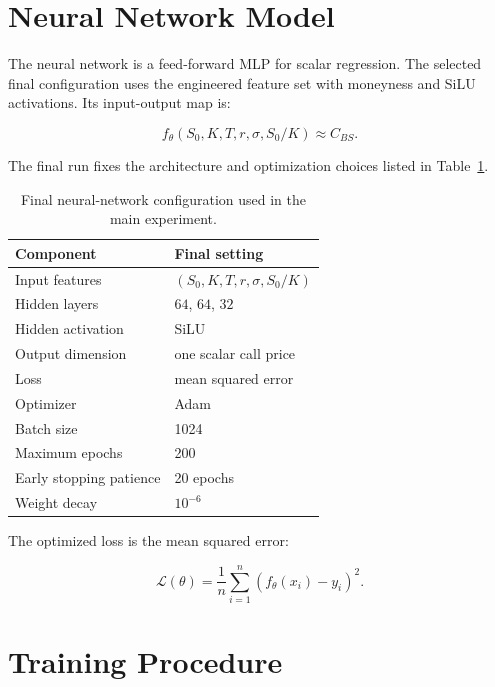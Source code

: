 \section{Neural Network Model}

The neural network is a feed-forward MLP for scalar regression.
The selected final configuration uses the engineered feature set with moneyness and SiLU activations.
Its input-output map is:

\begin{equation}
    f_\theta(S_0, K, T, r, \sigma, S_0/K)
    \approx
    C_{BS}.
\end{equation}

The final run fixes the architecture and optimization choices listed in Table~\ref{tab:nn-methodology-config}.

\begin{table}[H]
    \centering
    \begin{tabular}{ll}
        \toprule
        Component & Final setting \\
        \midrule
        Input features & $(S_0, K, T, r, \sigma, S_0/K)$ \\
        Hidden layers & $64$, $64$, $32$ \\
        Hidden activation & SiLU \\
        Output dimension & one scalar call price \\
        Loss & mean squared error \\
        Optimizer & Adam \\
        Batch size & 1024 \\
        Maximum epochs & 200 \\
        Early stopping patience & 20 epochs \\
        Weight decay & $10^{-6}$ \\
        \bottomrule
    \end{tabular}
    \caption{Final neural-network configuration used in the main experiment.}
    \label{tab:nn-methodology-config}
\end{table}

The optimized loss is the mean squared error:

\begin{equation}
    \mathcal{L}(\theta) =
    \frac{1}{n}
    \sum_{i=1}^{n}
    \left(f_\theta(x_i) - y_i\right)^2.
\end{equation}

\section{Training Procedure}

